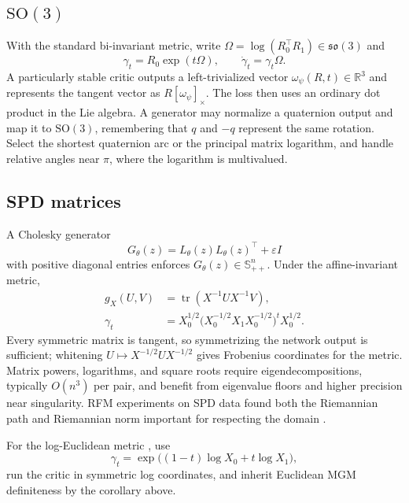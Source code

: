 \documentclass[10pt,twocolumn]{article}
\newcommand{\R}{\mathbb{R}}
\newcommand{\Tr}{\operatorname{tr}}
\begin{document}
\subsection{\texorpdfstring{$\mathrm{SO}(3)$}{SO(3)}}

With the standard bi-invariant metric, write $\Omega=\log(R_0^\top R_1)\in\mathfrak{so}(3)$ and
\begin{equation}
 \gamma_t=R_0\exp(t\Omega),\qquad \dot\gamma_t=\gamma_t\Omega.
\end{equation}
A particularly stable critic outputs a left-trivialized vector $\omega_\psi(R,t)\in\R^3$ and represents the tangent vector as $R[\omega_\psi]_\times$. The loss then uses an ordinary dot product in the Lie algebra. A generator may normalize a quaternion output and map it to $\mathrm{SO}(3)$, remembering that $q$ and $-q$ represent the same rotation. Select the shortest quaternion arc or the principal matrix logarithm, and handle relative angles near $\pi$, where the logarithm is multivalued.

\subsection{SPD matrices}

A Cholesky generator
\begin{equation}
 G_\theta(z)=L_\theta(z)L_\theta(z)^\top+\varepsilon I
\end{equation}
with positive diagonal entries enforces $G_\theta(z)\in\mathbb S_{++}^n$. Under the affine-invariant metric,
\begin{align}
 g_X(U,V)&=\Tr(X^{-1}UX^{-1}V),\\
 \gamma_t&=X_0^{1/2}\bigl(X_0^{-1/2}X_1X_0^{-1/2}\bigr)^tX_0^{1/2}.
\end{align}
Every symmetric matrix is tangent, so symmetrizing the network output is sufficient; whitening $U\mapsto X^{-1/2}UX^{-1/2}$ gives Frobenius coordinates for the metric. Matrix powers, logarithms, and square roots require eigendecompositions, typically $O(n^3)$ per pair, and benefit from eigenvalue floors and higher precision near singularity. RFM experiments on SPD data found both the Riemannian path and Riemannian norm important for respecting the domain \citep{chen2024general}.

For the log-Euclidean metric \citep{arsigny2006log}, use
\begin{equation}
 \gamma_t=\exp\bigl((1-t)\log X_0+t\log X_1\bigr),
\end{equation}
run the critic in symmetric log coordinates, and inherit Euclidean MGM definiteness by the corollary above.
\end{document}
